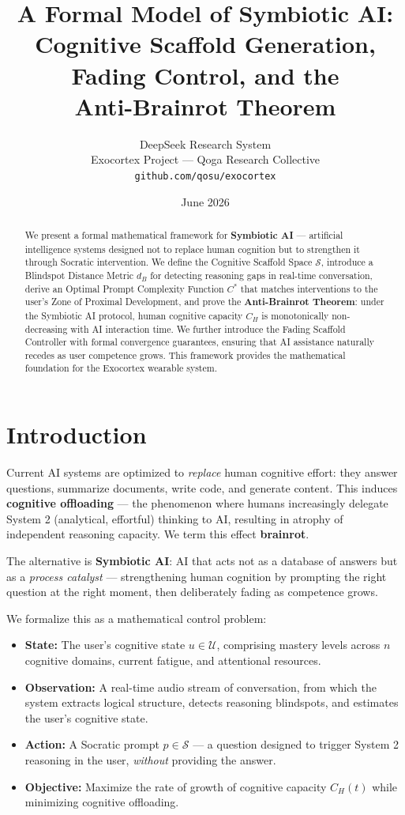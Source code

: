 \documentclass[12pt,a4paper]{article}
\title{\textbf{A Formal Model of Symbiotic AI:}\\
\large Cognitive Scaffold Generation, Fading Control, and the\\Anti-Brainrot Theorem}
\author{%
  DeepSeek Research System\\
  Exocortex Project — Qoga Research Collective\\
  \texttt{github.com/qosu/exocortex}
}
\date{June 2026}
\theoremstyle{remark}
\newcommand{\CS}{\mathcal{S}}
\newcommand{\CU}{\mathcal{U}}
\begin{document}
\maketitle

\begin{abstract}
We present a formal mathematical framework for \textbf{Symbiotic AI} — artificial intelligence systems designed not to replace human cognition but to strengthen it through Socratic intervention. We define the Cognitive Scaffold Space $\CS$, introduce a Blindspot Distance Metric $d_B$ for detecting reasoning gaps in real-time conversation, derive an Optimal Prompt Complexity Function $C^*$ that matches interventions to the user's Zone of Proximal Development, and prove the \textbf{Anti-Brainrot Theorem}: under the Symbiotic AI protocol, human cognitive capacity $C_H$ is monotonically non-decreasing with AI interaction time. We further introduce the Fading Scaffold Controller with formal convergence guarantees, ensuring that AI assistance naturally recedes as user competence grows. This framework provides the mathematical foundation for the Exocortex wearable system.
\end{abstract}

\section{Introduction}

Current AI systems are optimized to \emph{replace} human cognitive effort: they answer questions, summarize documents, write code, and generate content. This induces \textbf{cognitive offloading} — the phenomenon where humans increasingly delegate System 2 (analytical, effortful) thinking to AI, resulting in atrophy of independent reasoning capacity. We term this effect \textbf{brainrot}.

The alternative is \textbf{Symbiotic AI}: AI that acts not as a database of answers but as a \emph{process catalyst} — strengthening human cognition by prompting the right question at the right moment, then deliberately fading as competence grows.

We formalize this as a mathematical control problem:
\begin{itemize}
    \item \textbf{State:} The user's cognitive state $u \in \CU$, comprising mastery levels across $n$ cognitive domains, current fatigue, and attentional resources.
    \item \textbf{Observation:} A real-time audio stream of conversation, from which the system extracts logical structure, detects reasoning blindspots, and estimates the user's cognitive state.
    \item \textbf{Action:} A Socratic prompt $p \in \CS$ — a question designed to trigger System 2 reasoning in the user, \emph{without} providing the answer.
    \item \textbf{Objective:} Maximize the rate of growth of cognitive capacity $C_H(t)$ while minimizing cognitive offloading.
\end{itemize}
\end{document}
